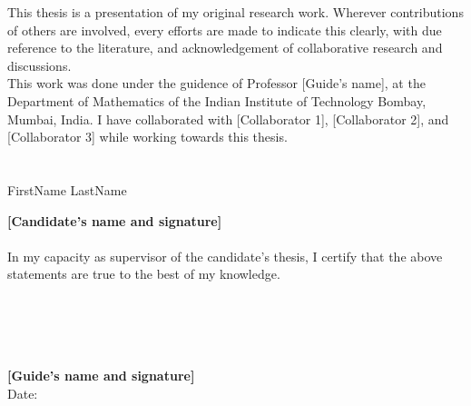 \documentclass[11pt,english,
onehalfspacing,
headsepline]{thesis}
\numberwithin{equation}{subsection}
\theoremstyle{definition}
\begin{document}

\begin{declaration}

\noindent
This thesis is a presentation of my original research work. Wherever contributions of others 
are involved, every efforts are made to indicate this clearly, with due reference to the 
literature, and acknowledgement of collaborative research and discussions.  \\ 

\noindent 
This work was done under the guidence of Professor [Guide's name], at the Department of Mathematics 
of the Indian Institute of Technology Bombay, Mumbai, India. I have collaborated with [Collaborator 1], 
[Collaborator 2], and [Collaborator 3] while working towards this thesis. \\ \\ \\  


\hfill{FirstName LastName \hspace*{60px}} 

\hfill{\textbf{[Candidate's name and signature]}} \\ \\

\noindent
In my capacity as supervisor of the candidate's thesis, I certify that the above statements 
are true to the best of my knowledge. \\ \\ \\ \\ \\


\noindent
\hspace*{10px}\supname %

\noindent
\textbf{[Guide's name and signature]} \\ 

\noindent 
Date: 

\end{declaration}

\end{document}
